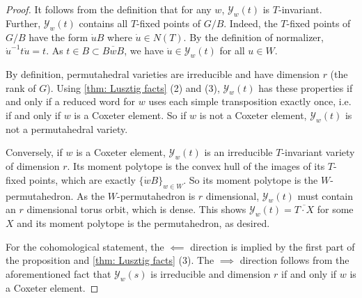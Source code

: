 \documentclass[11pt]{amsart}
\theoremstyle{definition}
\newcommand{\MSB}[1]{\textcolor{violet}{[MSB: #1]}}
\newcommand{\AK}[1]{\textcolor{darkgreen}{[AK: #1]}}
\DeclareMathOperator{\Perm}{Perm}
\newcommand\calY{{\mathcal Y}}
\newcommand\junk[1]{}
\begin{document}
\begin{proof}
	It follows from the definition that for any $w$, $\calY_w(t)$ is
	$T$-invariant. Further, $\calY_w(t)$ contains all $T$-fixed points
	of $G/B$. Indeed, the $T$-fixed points of $G/B$ have the form
	$\dot u B$ where $\dot u \in N(T)$. By the definition of normalizer,
	$\dot u^{-1} t \dot u =t $. As $t \in B \subset \overline{B w B}$,
	we have $\dot u \in \calY_w(t)$ for all $u \in W$.
	
	By definition, permutahedral varieties are irreducible and have
	dimension $r$ (the rank of $G$). Using \cref{thm: Lusztig facts} (2) and (3),
	$\calY_w(t)$ has these properties if and only if a reduced word for
	$w$ uses each simple transposition exactly once, i.e. if and only if
	$w$ is a Coxeter element. So if $w$ is not a Coxeter element,
	$\calY_w(t)$ is not a permutahedral variety.
	
	Conversely, if $w$ is a Coxeter element, $\calY_w(t)$ is an irreducible $T$-invariant variety of dimension $r$. Its moment polytope is the convex hull of the images of its $T$-fixed points, which are exactly $\{\dot w B\}_{w \in W}$. So its moment polytope is the $W$-permutahedron. As the $W$-permutahedron is $r$ dimensional, $\calY_w(t)$ must contain an $r$ dimensional torus orbit, which is dense. This shows $\calY_w(t) = \overline{T \cdot X}$ for some $X$ and its moment polytope is the permutahedron, as desired.
	
	For the cohomological statement, the $\impliedby$ direction is implied by the first part of the proposition and \cref{thm: Lusztig facts} (3). The $\implies$ direction follows from the aforementioned fact that $\calY_w(s)$ is irreducible and dimension $r$ if and only if $w$ is a Coxeter element.
\end{proof}

\junk{\MSB{Is it true that $[\calY_w(s)] = [\Perm]$ is the permutahedral
		class if and only if $w=c$? For all other $w$, either
		$\dim \calY_w(s)> n-1$ or $\calY_w(s)$ is reducible. I think the
		former clearly rules out that $[\calY_w(s)] = [\Perm]$, but not as
		clear about the latter.}
	\AK{I'm not seeing a trivial way to rule it out, what with not having a
		particularly computable formula for the class as a combination
		of Schubert classes. Trivially, the two are different in {\em $T$-equivariant}
		cohomology. I think one could maybe show that $[Perm]$ times a
		certain product of $c_1$s = $[\calY_w(t)]$ times a different product
		of $c_1$s. Anyway, the basic issue is that for $w$ not using all
		the generators, $\calY_w(t)$ is disconnected, i.e. not a ``variety'',
		so shouldn't we just say those are dumb and disallow them?}
	\MSB{Yeah, seems good.}}
\end{document}
